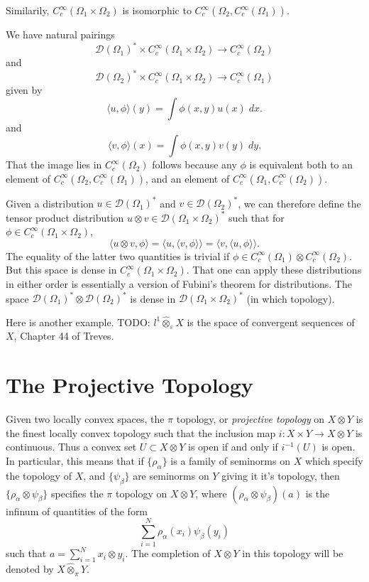Similarily, $C_c^\infty(\Omega_1 \times \Omega_2)$ is isomorphic to $C_c^\infty(\Omega_2, C_c^\infty(\Omega_1))$.

We have natural pairings
%
\[ \mathcal{D}(\Omega_1)^* \times C_c^\infty(\Omega_1 \times \Omega_2) \to C_c^\infty(\Omega_2) \]
%
and
%
\[ \mathcal{D}(\Omega_2)^* \times C_c^\infty(\Omega_1 \times \Omega_2) \to C_c^\infty(\Omega_1) \]
%
given by
%
\[ \langle u, \phi \rangle(y) = \int \phi(x,y) u(x)\; dx. \]
%
and
%
\[ \langle v, \phi \rangle(x) = \int \phi(x,y) v(y)\; dy. \]
%
That the image lies in $C_c^\infty(\Omega_2)$ follows because any $\phi$ is equivalent both to an element of $C_c^\infty(\Omega_2, C_c^\infty(\Omega_1))$, and an element of $C_c^\infty(\Omega_1, C_c^\infty(\Omega_2))$.

Given a distribution $u \in \mathcal{D}(\Omega_1)^*$ and $v \in \mathcal{D}(\Omega_2)^*$, we can therefore define the tensor product distribution $u \otimes v \in \mathcal{D}(\Omega_1 \times \Omega_2)^*$ such that for $\phi \in C_c^\infty(\Omega_1 \times \Omega_2)$,
%
\[ \langle u \otimes v, \phi \rangle = \langle u, \langle v, \phi \rangle \rangle = \langle v, \langle u, \phi \rangle \rangle. \]
%
The equality of the latter two quantities is trivial if $\phi \in C_c^\infty(\Omega_1) \otimes C_c^\infty(\Omega_2)$. But this space is dense in $C_c^\infty(\Omega_1 \times \Omega_2)$. That one can apply these distributions in either order is essentially a version of Fubini's theorem for distributions. The space $\mathcal{D}(\Omega_1)^* \otimes \mathcal{D}(\Omega_2)^*$ is dense in $\mathcal{D}(\Omega_1 \times \Omega_2)^*$ (in which topology).

Here is another example. TODO: $l^1 \widehat{\otimes}_\varepsilon X$ is the space of convergent sequences of $X$, Chapter 44 of Treves.

\section{The Projective Topology}

Given two locally convex spaces, the $\pi$ topology, or \emph{projective topology} on $X \otimes Y$ is the finest locally convex topology such that the inclusion map $i: X \times Y \to X \otimes Y$ is continuous. Thus a convex set $U \subset X \otimes Y$ is open if and only if $i^{-1}(U)$ is open. In particular, this means that if $\{ \rho_\alpha \}$ is a family of seminorms on $X$ which specify the topology of $X$, and $\{ \psi_\beta \}$ are seminorms on $Y$ giving it it's topology, then $\{ \rho_\alpha \otimes \psi_\beta \}$ specifies the $\pi$ topology on $X \otimes Y$, where $(\rho_\alpha \otimes \psi_\beta)(a)$ is the infinum of quantities of the form
%
\[ \sum_{i = 1}^N \rho_\alpha(x_i) \psi_\beta(y_i) \]
%
such that $a = \sum_{i = 1}^N x_i \otimes y_i$. The completion of $X \otimes Y$ in this topology will be denoted by $X \widehat{\otimes}_\pi Y$.

